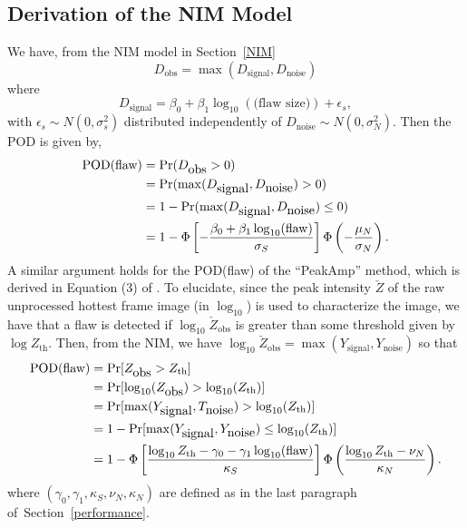 \documentclass[12pt]{article}
\begin{document}
\subsection{Derivation of the NIM Model}
\label{supp.deriv}
 We have, from the NIM model in Section~\ref{NIM}
 \begin{equation*}
  D_{\mbox{obs}} =
  \max(D_{\mbox{signal}},D_{\mbox{noise}})
  \end{equation*}
  where
\begin{equation*}
  D_{\mbox{signal}} =
  \beta_0+\beta_1 \log_{10}(\mbox{(flaw size)}) + \epsilon_s,
\end{equation*}
with $\epsilon_s\sim N(0,\sigma_s^2)$ distributed independently of
$D_{\mbox{noise}} \sim N(0,\sigma_N^2)$. Then the POD is given by,
\begin{equation*}
\begin{split}
  \mbox{POD(flaw)} & = \Pr(D_{\mbox{obs}} > 0)\\
  & = \Pr(\max(D_{\mbox{signal}},D_{\mbox{noise}}) > 0) \\
  & = 1-\Pr(\max(D_{\mbox{signal}},D_{\mbox{noise}}) \leq 0)\\
  & =  1-{\rm \Phi }\left[ 
-\frac{\beta _{0} +\beta _{1} \log_{10} ({\rm flaw})}{\sigma _{S} 
} \right]\Phi \left(-\frac{\mu _{N} }{\sigma _{N} } \right). \\
\end{split}
\end{equation*}
 A similar argument holds for the POD(flaw) of the ``PeakAmp''
 method, which is derived in Equation (3) of \cite{liandmeeker09}. To
 elucidate, since the 
 peak intensity $\check Z$ of the raw unprocessed hottest 
 frame image  (in $\log_{10}$) is used to characterize the image, we
 have that a flaw is detected if $\log_{10}\check Z_{\mbox{obs}}$ is
 greater than some threshold given by $\log Z_{\mbox{th}}$. Then, from
 the NIM, we have $\log_{10}\check Z_{\mbox{obs}} = 
 \max(Y_{\mbox{signal}},Y_{\mbox{noise}})$ so that 
  \begin{equation*}
\begin{split}
  \mbox{POD(flaw)} & = \Pr[Z_{\mbox{obs}} > Z_{\rm th}]\\
  & = \Pr[\log_{10}(Z_{\mbox{obs}}) > \log_{10}(Z_{\rm th})]\\
  & = \Pr[\max(Y_{\mbox{signal}},T_{\mbox{noise}}) > \log_{10}(Z_{\rm th})] \\
  & = 1-\Pr[\max(Y_{\mbox{signal}},Y_{\mbox{noise}} ) \leq \log_{10}(Z_{\rm th})]\\
  & =  1-{\rm \Phi }\left[ 
\frac{\log_{10}Z_{\rm th} - \gamma _{0} - \gamma _{1} \log_{10} ({\rm flaw})}{\kappa _{S} } \right]\Phi \left(\frac{\log_{10}Z_{\rm th} -\nu _{N} }{\kappa _{N} } \right). \\
\end{split}
\end{equation*}
where 
$(\gamma_0,\gamma_1,\kappa_S,\nu_N,\kappa_N)$ are defined as in the
last paragraph of~Section~\ref{performance}.
\renewcommand{\baselinestretch}{1}\normalsize
\begingroup
\def\bibfont{\small}


\endgroup
\end{document}
